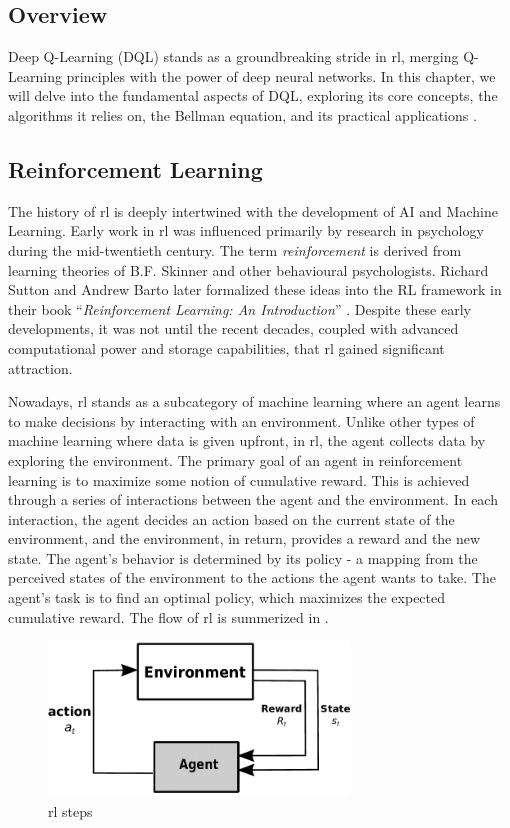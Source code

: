 \documentclass[12pt,a4paper,openright,twoside]{book}
\begin{document}
\subsection{Overview}

Deep Q-Learning (DQL) stands as a groundbreaking stride in \ac{rl}, merging Q-Learning principles with the power of deep neural networks. In this chapter, we will delve into the fundamental aspects of DQL, exploring its core concepts, the algorithms it relies on, the Bellman equation, and its practical applications \cite{DBLP:journals/corr/MnihKSGAWR13}.

\subsection{Reinforcement Learning}

The history of \ac{rl} is deeply intertwined with the development of AI and Machine Learning. 
Early work in \ac{rl} was influenced primarily by research in psychology during the mid-twentieth century. The term \emph{reinforcement} is 
derived from learning theories of B.F. Skinner and other behavioural psychologists. Richard Sutton and Andrew Barto later 
formalized these ideas into the RL framework in their book ``\emph{Reinforcement Learning: An Introduction}'' \cite{Sutton1998}. 
Despite these early developments, it was not until the recent decades, coupled with advanced computational power and storage 
capabilities, that \ac{rl} gained significant attraction.

Nowadays, \ac{rl} stands as a subcategory of machine learning where an agent learns to make decisions by interacting with an environment. 
Unlike other types of machine learning where data is given upfront, in \ac{rl}, the agent collects data by exploring the environment.
The primary goal of an agent in reinforcement learning is to maximize some notion of cumulative reward. 
This is achieved through a series of interactions between the agent and the environment. 
In each interaction, the agent decides an action based on the current state of the environment, and the environment, in return, provides a reward and the new state. 
The agent's behavior is determined by its policy - a mapping from the perceived states of the environment to the actions the agent wants to take. 
The agent’s task is to find an optimal policy, which maximizes the expected cumulative reward. The flow of \ac{rl} is summerized in .

\begin{figure}
    \centering
    \includegraphics[width=8cm]{img/rl.png}
    \caption{\ac{rl} steps}
    \label{fig:j}
\end{figure}
\end{document}
